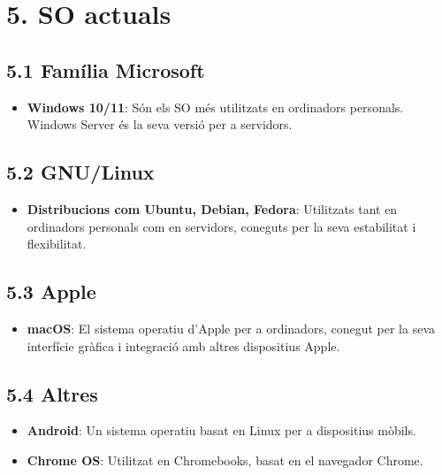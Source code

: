 \documentclass[
  a4paper,
]{article}
\providecommand{\tightlist}{%
  \setlength{\itemsep}{0pt}\setlength{\parskip}{0pt}}
\begin{document}
\section{5. SO actuals}\label{so-actuals}

\subsection{5.1 Família Microsoft}\label{famuxedlia-microsoft}

\begin{itemize}
\tightlist
\item
  \textbf{Windows 10/11}: Són els SO més utilitzats en ordinadors
  personals. Windows Server és la seva versió per a servidors.
\end{itemize}

\subsection{5.2 GNU/Linux}\label{gnulinux}

\begin{itemize}
\tightlist
\item
  \textbf{Distribucions com Ubuntu, Debian, Fedora}: Utilitzats tant en
  ordinadors personals com en servidors, coneguts per la seva
  estabilitat i flexibilitat.
\end{itemize}

\subsection{5.3 Apple}\label{apple}

\begin{itemize}
\tightlist
\item
  \textbf{macOS}: El sistema operatiu d'Apple per a ordinadors, conegut
  per la seva interfície gràfica i integració amb altres dispositius
  Apple.
\end{itemize}

\subsection{5.4 Altres}\label{altres}

\begin{itemize}
\tightlist
\item
  \textbf{Android}: Un sistema operatiu basat en Linux per a dispositius
  mòbils.
\item
  \textbf{Chrome OS}: Utilitzat en Chromebooks, basat en el navegador
  Chrome.
\end{itemize}
\end{document}
